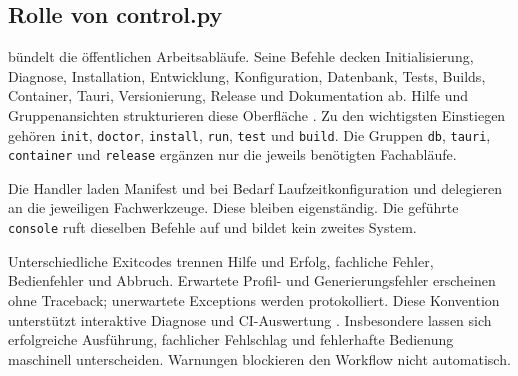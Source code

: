 \subsection{Rolle von control.py}
\label{subsec:rolle-control-py}

 bündelt die öffentlichen Arbeitsabläufe. Seine Befehle
decken Initialisierung, Diagnose, Installation, Entwicklung, Konfiguration,
Datenbank, Tests, Builds, Container, Tauri, Versionierung, Release und
Dokumentation ab. Hilfe und Gruppenansichten strukturieren diese Oberfläche
\parencite{kleiveist2026control,kleiveist2026tooling}.
Zu den wichtigsten Einstiegen gehören \texttt{init}, \texttt{doctor},
\texttt{install}, \texttt{run}, \texttt{test} und \texttt{build}. Die Gruppen
\texttt{db}, \texttt{tauri}, \texttt{container} und \texttt{release} ergänzen
nur die jeweils benötigten Fachabläufe.



Die Handler laden Manifest und bei Bedarf Laufzeitkonfiguration und delegieren
an die jeweiligen Fachwerkzeuge. Diese bleiben eigenständig. Die geführte
\texttt{console} ruft dieselben Befehle auf und bildet kein zweites System.

Unterschiedliche Exitcodes trennen Hilfe und Erfolg, fachliche Fehler,
Bedienfehler und Abbruch. Erwartete Profil- und Generierungsfehler erscheinen
ohne Traceback; unerwartete Exceptions werden protokolliert. Diese Konvention
unterstützt interaktive Diagnose und CI-Auswertung
\parencite{kleiveist2026control,kleiveist2026ci}.
Insbesondere lassen sich erfolgreiche Ausführung, fachlicher Fehlschlag und
fehlerhafte Bedienung maschinell unterscheiden. Warnungen blockieren den
Workflow nicht automatisch.
